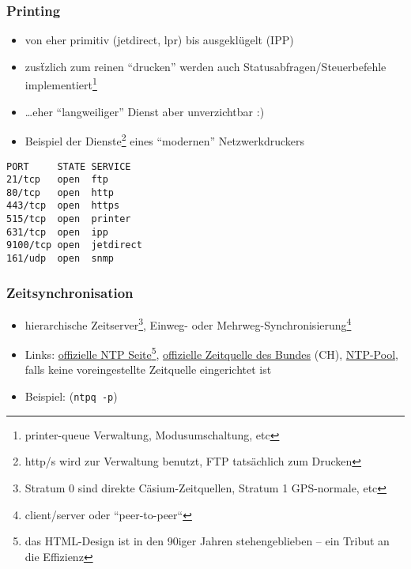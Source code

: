 \documentclass[ignorenonframetext]{beamer}
\begin{document}
\begin{frame}[fragile]
\frametitle{Printing}
\begin{itemize}
	\item von eher primitiv (jetdirect, lpr) bis ausgekl\"ugelt (IPP)
	\item zus\"tzlich zum reinen ``drucken'' werden auch Statusabfragen/Steuerbefehle implementiert\footnote{printer-queue Verwaltung, Modusumschaltung, etc}
	\item \ldots eher ``langweiliger'' Dienst aber unverzichtbar :)
	\item Beispiel der Dienste\footnote{http/s wird zur Verwaltung benutzt, FTP tats\"achlich zum Drucken} eines ``modernen'' Netzwerkdruckers
	\end{itemize}
\begin{center}
	\begin{tiny}
	\begin{Verbatim}
PORT     STATE SERVICE
21/tcp   open  ftp
80/tcp   open  http
443/tcp  open  https
515/tcp  open  printer
631/tcp  open  ipp
9100/tcp open  jetdirect
161/udp  open  snmp
\end{Verbatim}
\end{tiny}
\end{center}
\end{frame}



\begin{frame}
\frametitle{Zeitsynchronisation}
\begin{itemize}
    \item hierarchische Zeitserver\footnote{Stratum 0 sind direkte C\"asium-Zeitquellen, Stratum 1 GPS-normale, etc}, Einweg- oder Mehrweg-Synchronisierung\footnote{client/server oder ``peer-to-peer``}
    \item Links: \href{http://support.ntp.org/bin/view/Main/WebHome}{offizielle NTP Seite}\footnote{das HTML-Design ist in den 90iger Jahren stehengeblieben -- ein Tribut an die Effizienz}, \href{https://www.metas.ch/metas/en/home/fabe/zeit-und-frequenz/time-dissemination.html}{offizielle Zeitquelle des Bundes} (CH), \href{https://www.ntppool.org/}{NTP-Pool}, falls keine voreingestellte Zeitquelle eingerichtet ist

	
	\item Beispiel: (\texttt{ntpq -p})
\end{itemize}
\begin{center}
\begin{tiny}

\end{tiny}
\end{center}

\end{frame}
\end{document}
